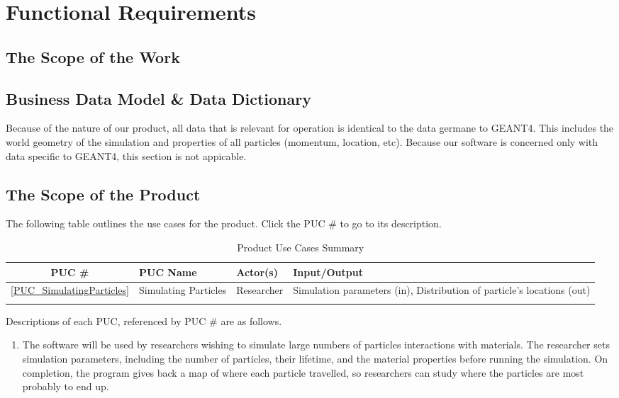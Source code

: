 \documentclass[12pt]{article}
\begin{document}
\section{Functional Requirements}

\subsection{The Scope of the Work} %

\subsection{Business Data Model \& Data Dictionary} %
Because of the nature of our product, all data that is relevant for operation is identical to the data germane to GEANT4. 
This includes the world geometry of the simulation and properties of all particles (momentum, location, etc). Because our 
software is concerned only with data specific to GEANT4, this section is not appicable. 

\subsection{The Scope of the Product}
The following table outlines the use cases for the product. Click the PUC \# to go to its description.

\begin{table}[h]
\centering
\caption{Product Use Cases Summary}
\begin{tabularx}{\textwidth}{c|l|l|X}
\Xhline{2\arrayrulewidth}
\bf PUC \# & \bf PUC Name & Actor(s) & \bf Input/Output\\
\hline
\ref{PUC_SimulatingParticles} & Simulating Particles & Researcher & Simulation parameters (in), Distribution of particle's locations (out)\\
\Xhline{2\arrayrulewidth}
\end{tabularx}
\end{table}

Descriptions of each PUC, referenced by PUC \# are as follows.
\begin{enumerate}
\item \label{PUC_SimulatingParticles} The software will be used by researchers wishing to simulate large numbers of particles interactions with materials. The researcher sets simulation parameters, including the number of particles, their lifetime, and the material properties before running the simulation. On completion, the program gives back a map of where each particle travelled, so researchers can study where the particles are most probably to end up.
\end{enumerate}
\end{document}

